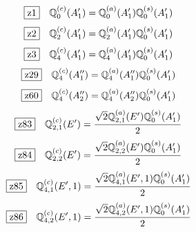 \documentclass[fleqn,10pt,landscape]{jsarticle}
\begin{document}
\begin{dmath*}
\hspace*{3mm}\fbox{z1}\quad \mathbb{Q}_{0}^{(c)}(A_{1}^{\prime})=\mathbb{Q}_{0}^{(a)}(A_{1}^{\prime}) \mathbb{Q}_{0}^{(s)}(A_{1}^{\prime})
\end{dmath*}
\begin{dmath*}
\hspace*{3mm}\fbox{z2}\quad \mathbb{Q}_{2}^{(c)}(A_{1}^{\prime})=\mathbb{Q}_{2}^{(a)}(A_{1}^{\prime}) \mathbb{Q}_{0}^{(s)}(A_{1}^{\prime})
\end{dmath*}
\begin{dmath*}
\hspace*{3mm}\fbox{z3}\quad \mathbb{Q}_{4}^{(c)}(A_{1}^{\prime})=\mathbb{Q}_{4}^{(a)}(A_{1}^{\prime}) \mathbb{Q}_{0}^{(s)}(A_{1}^{\prime})
\end{dmath*}
\begin{dmath*}
\hspace*{3mm}\fbox{z29}\quad \mathbb{Q}_{4}^{(c)}(A_{1}^{\prime\prime})=\mathbb{Q}_{4}^{(a)}(A_{1}^{\prime\prime}) \mathbb{Q}_{0}^{(s)}(A_{1}^{\prime})
\end{dmath*}
\begin{dmath*}
\hspace*{3mm}\fbox{z60}\quad \mathbb{Q}_{4}^{(c)}(A_{2}^{\prime\prime})=\mathbb{Q}_{4}^{(a)}(A_{2}^{\prime\prime}) \mathbb{Q}_{0}^{(s)}(A_{1}^{\prime})
\end{dmath*}
\begin{dmath*}
\hspace*{3mm}\fbox{z83}\quad \mathbb{Q}_{2,1}^{(c)}(E^{\prime})=\frac{\sqrt{2} \mathbb{Q}_{2,1}^{(a)}(E^{\prime}) \mathbb{Q}_{0}^{(s)}(A_{1}^{\prime})}{2}
\end{dmath*}
\begin{dmath*}
\hspace*{3mm}\fbox{z84}\quad \mathbb{Q}_{2,2}^{(c)}(E^{\prime})=\frac{\sqrt{2} \mathbb{Q}_{2,2}^{(a)}(E^{\prime}) \mathbb{Q}_{0}^{(s)}(A_{1}^{\prime})}{2}
\end{dmath*}
\begin{dmath*}
\hspace*{3mm}\fbox{z85}\quad \mathbb{Q}_{4,1}^{(c)}(E^{\prime},1)=\frac{\sqrt{2} \mathbb{Q}_{4,1}^{(a)}(E^{\prime},1) \mathbb{Q}_{0}^{(s)}(A_{1}^{\prime})}{2}
\end{dmath*}
\begin{dmath*}
\hspace*{3mm}\fbox{z86}\quad \mathbb{Q}_{4,2}^{(c)}(E^{\prime},1)=\frac{\sqrt{2} \mathbb{Q}_{4,2}^{(a)}(E^{\prime},1) \mathbb{Q}_{0}^{(s)}(A_{1}^{\prime})}{2}
\end{dmath*}
\end{document}
